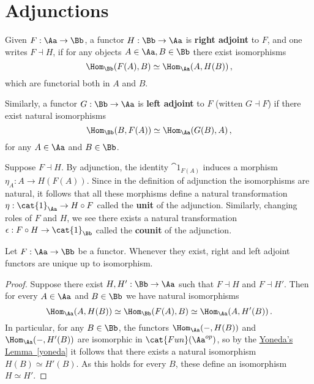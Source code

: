
\section{Adjunctions}

\begin{df}
    Given $F:\Aa \to \Bb$, a functor $H : \Bb \to \Aa$
    is \textbf{right adjoint} to $F$, and one writes $F \dashv H$,
    if for any objects $A \in \Aa, B \in \Bb$ there exist 
    isomorphisms
    \begin{equation}\label{adj-morphism}
        \Hom_{\Bb}(F(A),B) \simeq \Hom_{\Aa}(A, H(B))\,,
    \end{equation}
    which are functorial both in $A$ and $B$.

    Similarly, a functor $G : \Bb \to \Aa$ is \textbf{left adjoint}
    to $F$ (witten $G \dashv F$) if there exist natural isomorphisms 
    \begin{equation}\label{l-adj-morphism}
        \Hom_{\Bb}(B, F(A)) \simeq \Hom_{\Aa}(G(B), A)\,,
    \end{equation}
    for any $A \in \Aa$ and $B \in \Bb$.
\end{df}

\begin{rmk}
        Suppose $F \dashv H$. By adjunction, the identity
        $\cat{1}_{F(A)}$ induces a morphism 
        $\eta_{A} : A \to H(F(A))$.
        Since in the definition of adjunction
        the isomorphisms are natural,
        it follows that all these morphisms define
        a natural transformation $\eta : \cat{1}_{\Aa} \to H \circ F$
        called the \textbf{unit} of the adjunction.
        Similarly, changing roles of $F$ and $H$, we see there exists
        a natural transformation $\epsilon : F \circ H \to \cat{1}_{\Bb}$ called 
        the \textbf{counit} of the adjunction.
\end{rmk}

\begin{prop}
    Let $F : \Aa \to \Bb$ be a functor. Whenever they exist,
    right and left adjoint functors are unique up to isomorphism.
    \begin{proof}
        Suppose there exist $H, H':\Bb \to \Aa$ such that 
        $F \dashv H$ and $F \dashv H'$.
        Then for every $A \in \Aa$ and $B \in \Bb$ we have 
        natural isomorphisms
        \begin{equation*}
            \Hom_{\Aa}(A,H(B)) \simeq 
            \Hom_{\Bb}(F(A),B) \simeq 
            \Hom_{\Aa}(A,H'(B))\,.
        \end{equation*}
        In particular, for any $B \in \Bb$, the functors
        $\Hom_{\Aa}(-,H(B))$ and $\Hom_{\Aa}(-,H'(B))$
        are isomorphic in $\cat{Fun}(\Aa^{op})$,
        so by the \hyperref[yoneda]{Yoneda's Lemma~\ref*{yoneda}}
        it follows that there exists a natural isomorphism
        $H(B) \simeq H'(B)$.
        As this holds for every $B$, these define
        an isomorphism $H \simeq H'$.
    \end{proof}
\end{prop}

